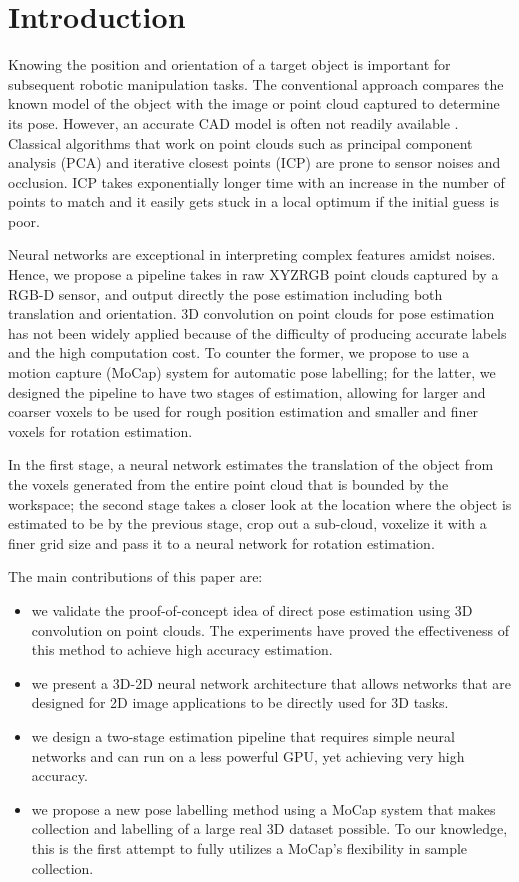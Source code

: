 \documentclass[conference]{IEEEtran}
\begin{document}
\section{Introduction}
Knowing the position and orientation of a target object is important for subsequent robotic manipulation tasks. The conventional approach compares the known model of the object with the image or point cloud captured to determine its pose. However, an accurate CAD model is often not readily available \cite{saxena_2008_ijrr}. Classical algorithms that work on point clouds such as principal component analysis (PCA) and iterative closest points (ICP) are prone to sensor noises and occlusion. ICP takes exponentially longer time with an increase in the number of points to match and it easily gets stuck in a local optimum if the initial guess is poor. 

Neural networks are exceptional in interpreting complex features amidst noises. Hence, we propose a pipeline takes in raw XYZRGB point clouds captured by a RGB-D sensor, and output directly the pose estimation including both translation and orientation. 3D convolution on point clouds for pose estimation has not been widely applied because of the difficulty of producing accurate labels and the high computation cost. To counter the former, we propose to use a motion capture (MoCap) system for automatic pose labelling; for the latter, we designed the pipeline to have two stages of estimation, allowing for larger and coarser voxels to be used for rough position estimation and smaller and finer voxels for rotation estimation.

In the first stage, a neural network estimates the translation of the object from the voxels generated from the entire point cloud that is bounded by the workspace; the second stage takes a closer look at the location where the object is estimated to be by the previous stage, crop out a sub-cloud, voxelize it with a finer grid size and pass it to a neural network for rotation estimation.

The main contributions of this paper are: 
\begin{itemize}
	\item we validate the proof-of-concept idea of direct pose estimation using 3D convolution on point clouds. The experiments have proved the effectiveness of this method to achieve high accuracy estimation.
	\item we present a 3D-2D neural network architecture that allows networks that are designed for 2D image applications to be directly used for 3D tasks.
	\item we design a two-stage estimation pipeline that requires simple neural networks and can run on a less powerful GPU, yet achieving very high accuracy.
	\item we propose a new pose labelling method using a MoCap system that makes collection and labelling of a large real 3D dataset possible. To our knowledge, this is the first attempt to fully utilizes a MoCap's flexibility in sample collection.
\end{itemize}
\end{document}
